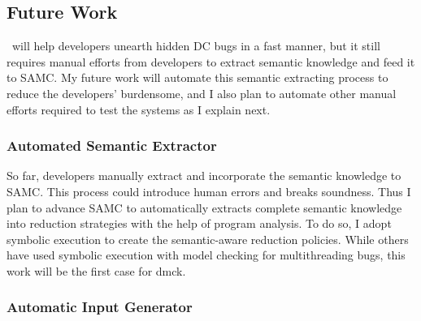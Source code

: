 \documentclass[10pt]{article}
\begin{document}



\subsection{Future Work}

\fullcheck\ will help developers unearth hidden DC bugs in a fast manner, but it
still requires manual efforts from developers to extract semantic knowledge and
feed it to SAMC.
%
My future work will automate this semantic extracting process to reduce the
developers' burdensome, and I also plan to automate other manual efforts required
to test the systems as I explain next.

\subsubsection*{Automated Semantic Extractor}

So far, developers manually extract and incorporate the semantic knowledge to
SAMC. This process could introduce human errors and breaks soundness. Thus I
plan to advance SAMC to automatically extracts complete semantic knowledge into
reduction strategies with the help of program analysis. To do so, I adopt
symbolic execution to create the semantic-aware reduction policies. While others
have used symbolic execution with model checking for multithreading bugs, this
work will be the first case for dmck. 

\subsubsection*{Automatic Input Generator}
\end{document}
